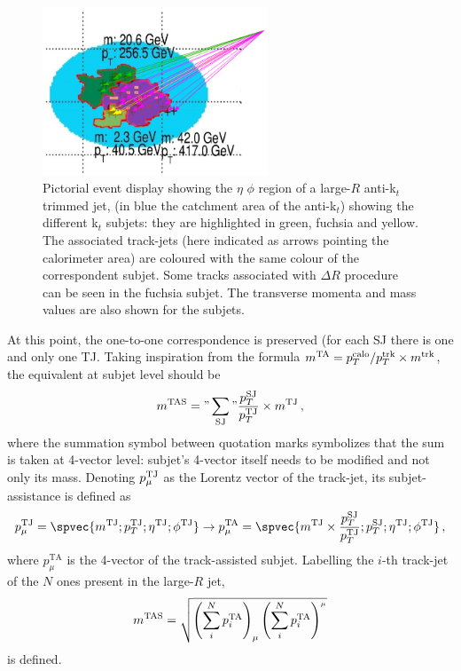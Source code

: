\begin{figure}[!ht]
  \centering
      \includegraphics[width=0.6\textwidth]{jet_part/mtas/mtas.png}
  \caption[Pictorial event display]{Pictorial event display showing the $\eta$ $\phi$ region of a large-$R$ anti-k$_t$ trimmed jet, (in blue the catchment area of the anti-k$_t$) showing the different k$_t$ subjets: they are highlighted in green, fuchsia and yellow. The associated track-jets (here indicated as arrows pointing the calorimeter area) are coloured with the same colour of the correspondent subjet. Some tracks associated with $\Delta R$ procedure can be seen in the fuchsia subjet. The transverse momenta and mass values are also shown for the subjets.}
  \label{fig:mtas1}
\end{figure}

At this point, the one-to-one correspondence is preserved (for each SJ there is one and only one TJ. Taking inspiration from the formula $m^\textrm{TA}=p_T^\textrm{calo}/p_T^\textrm{trk}\times m^\textrm{trk}$, the equivalent at subjet level should be
$$m^\textrm{TAS}="\sum_{\rm SJ}"\frac{p_T^{\rm SJ}}{p_T^{\rm TJ}}\times m^{\rm TJ}\,,$$
where the summation symbol between quotation marks symbolizes that the sum is taken at 4-vector level: subjet's 4-vector itself needs to be modified and not only its mass. Denoting $p_\mu^{\rm TJ}$ as the Lorentz vector of the track-jet, its subjet-assistance is defined as 
$$p_\mu^{\rm TJ} = \spvec{m^{\rm TJ};p_T^{\rm TJ};\eta^{\rm TJ};\phi^{\rm TJ}} \to p_\mu^\textrm{TA}=\spvec{m^{\rm TJ}\times\frac{p_T^{\rm SJ}}{p_T^{\rm TJ}} ;p_T^{\rm SJ};\eta^{\rm TJ};\phi^{\rm TJ}}\,,$$
where $p_\mu^\textrm{TA}$ is the 4-vector of the track-assisted subjet. Labelling the $i$-th track-jet of the $N$ ones present in the large-$R$ jet,
\begin{equation}\label{eq:foursum}
m^\textrm{TAS}=\sqrt{\left(\sum_i^N p^\textrm{TA}_i \right)_\mu \left(\sum_i^N p^\textrm{TA}_i \right)^{_\mu}}
\end{equation}
is defined.


